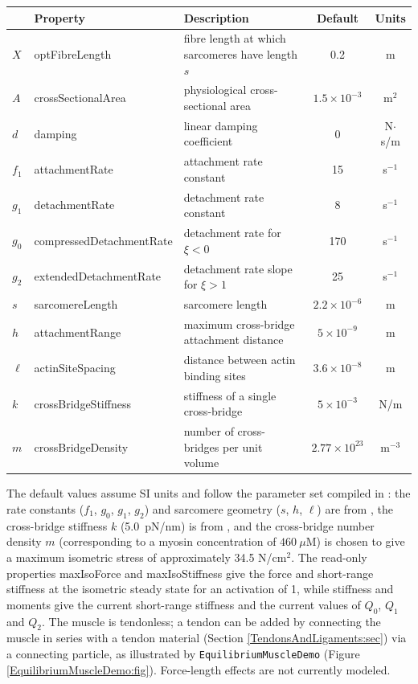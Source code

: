 \begin{center}
\begin{tabular}{|l|l|l|c|c|}
\hline
& Property & Description & Default & Units\\
\hline
$X$ & {\sf optFibreLength} &
fibre length at which sarcomeres have length $s$ & 0.2 & m \\
$A$ & {\sf crossSectionalArea} &
physiological cross-sectional area & $1.5 \times 10^{-3}$ & m$^2$ \\
$d$ & {\sf damping} & linear damping coefficient & 0 & N$\cdot$s/m \\
$f_1$ & {\sf attachmentRate} & attachment rate constant & 15 & s$^{-1}$ \\
$g_1$ & {\sf detachmentRate} & detachment rate constant & 8 & s$^{-1}$ \\
$g_0$ & {\sf compressedDetachmentRate} &
detachment rate for $\xi < 0$ & 170 & s$^{-1}$ \\
$g_2$ & {\sf extendedDetachmentRate} &
detachment rate slope for $\xi > 1$ & 25 & s$^{-1}$ \\
$s$ & {\sf sarcomereLength} & sarcomere length & $2.2 \times 10^{-6}$ & m \\
$h$ & {\sf attachmentRange} &
maximum cross-bridge attachment distance & $5 \times 10^{-9}$ & m \\
$\ell$ & {\sf actinSiteSpacing} &
distance between actin binding sites & $3.6 \times 10^{-8}$ & m \\
$k$ & {\sf crossBridgeStiffness} &
stiffness of a single cross-bridge & $5 \times 10^{-3}$ & N/m \\
$m$ & {\sf crossBridgeDensity} &
number of cross-bridges per unit volume & $2.77 \times 10^{23}$ & m$^{-3}$ \\
\hline
\end{tabular}
\end{center}

The default values assume SI units and follow the parameter set compiled
in \cite{barrett2024muscle}: the rate constants ($f_1$, $g_0$, $g_1$,
$g_2$) and sarcomere geometry ($s$, $h$, $\ell$) are from
\cite{zahalak1990modeling}, the cross-bridge stiffness $k$ (5.0~pN/nm)
is from \cite{ford1981relation,campbell2018force}, and the cross-bridge
number density $m$ (corresponding to a myosin concentration of
$460~\mu\text{M}$) is chosen to give a maximum isometric stress of
approximately 34.5 N/cm$^2$. The read-only properties {\sf
maxIsoForce} and {\sf maxIsoStiffness} give the force and short-range
stiffness at the isometric steady state for an activation of 1, while
{\sf stiffness} and {\sf moments} give the current short-range
stiffness and the current values of $Q_0$, $Q_1$ and $Q_2$. The muscle
is tendonless; a tendon can be added by connecting the muscle in series
with a tendon material (Section \ref{TendonsAndLigaments:sec}) via a
connecting particle, as illustrated by {\tt EquilibriumMuscleDemo}
(Figure \ref{EquilibriumMuscleDemo:fig}). Force-length effects are not
currently modeled.

